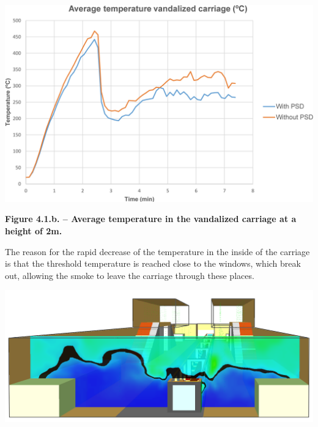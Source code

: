 \documentclass{article}
\begin{document}
\begin{mdcenter}%

\noindent{}\includegraphics[keepaspectratio=true,width=\dimmin{}{\dimwidth{0.55}}]{images/Fig-4.1.b}{}%
\end{mdcenter}%

\begin{mdcenter}%

\noindent{}\textbf{Figure 4.1.b. – Average temperature in the vandalized carriage at a height of 2m.}%
\end{mdcenter}%

\noindent{}The reason for the rapid decrease of the temperature in the inside of the carriage 
is that the threshold temperature is reached close to the windows, which break out, 
allowing the smoke to leave the carriage through these places.%

\begin{mdcenter}%

\noindent{}\includegraphics[keepaspectratio=true,width=\dimmin{}{\dimwidth{0.55}}]{images/Fig-4.1.c}{}%
\end{mdcenter}%
\end{document}
